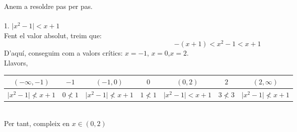 Anem a resoldre pas per pas.\\\\
1. $ \mid x^2 -1 \mid < x+1 $\\
Fent el valor absolut, treim que:
\begin{equation*}
-(x+1)<x^2-1<x+1
\end{equation*}
D'aquí, conseguim com a valors crítics: $x=-1$, $x=0$,$x=2$.\\
Llavors,\\
\begin{table}[h!]
\centering
\begin{tabular}{c|c|c|c|c|c|c}%
$(-\infty , -1)$& $-1$ & $(-1,0)$ & $0$ & $(0,2)$ & $2$ &$(2, \infty)$ \\
\hline
$\mid x^2 -1 \mid \nless x+1$  & $0 \nless 1$& $\mid x^2 -1 \mid \nless x+1$ & $1\nless 1$ & $\mid x^2 -1 \mid < x+1$ & $ 3\nless 3$ & $\mid x^2 -1 \mid \nless x+1$
\end{tabular}
\end{table}\\%
Per tant, compleix en $x \in (0,2)$\\\\

